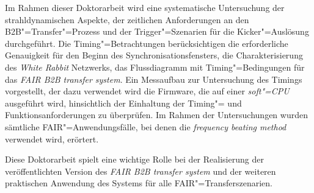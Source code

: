 Im Rahmen dieser Doktorarbeit wird eine systematische Untersuchung der strahldynamischen Aspekte, der zeitlichen Anforderungen an den B2B"=Transfer"=Prozess und der Trigger"=Szenarien f\"ur die Kicker"=Ausl\"osung durchgef\"uhrt. Die Timing"=Betrachtungen ber\"ucksichtigen die erforderliche Genauigkeit f\"ur den Beginn des Synchronisationsfensters, die Charakterisierung des \textit{White Rabbit} Netzwerks, das Flussdiagramm mit Timing"=Bedingungen f\"ur das \textit{FAIR B2B transfer system}. Ein Messaufbau zur Untersuchung des Timings vorgestellt, der dazu verwendet wird die Firmware, die auf einer \textit{soft"=CPU} ausgef\"uhrt wird, hinsichtlich der Einhaltung der Timing"= und Funktionsanforderungen zu \"uberpr\"ufen. Im Rahmen der Untersuchungen wurden s\"amtliche FAIR"=Anwendungsf\"alle, bei denen die \textit{frequency beating method} verwendet wird, er\"ortert.

Diese Doktorarbeit spielt eine wichtige Rolle bei der Realisierung der ver\"offentlichten Version des \textit{FAIR B2B transfer system} und der weiteren praktischen Anwendung des Systems f\"ur alle FAIR"=Transferszenarien.

